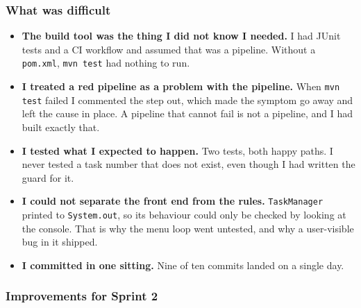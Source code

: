 \documentclass[11pt,a4paper]{article}
\newcommand{\code}[1]{\texttt{\small #1}}
\begin{document}
\subsubsection*{What was difficult}
\begin{itemize}
  \item \textbf{The build tool was the thing I did not know I needed.} I had
        JUnit tests and a CI workflow and assumed that was a pipeline. Without
        a \code{pom.xml}, \code{mvn test} had nothing to run.
  \item \textbf{I treated a red pipeline as a problem with the pipeline.} When
        \code{mvn test} failed I commented the step out, which made the symptom
        go away and left the cause in place. A pipeline that cannot fail is not
        a pipeline, and I had built exactly that.
  \item \textbf{I tested what I expected to happen.} Two tests, both happy
        paths. I never tested a task number that does not exist, even though I
        had written the guard for it.
  \item \textbf{I could not separate the front end from the rules.}
        \code{TaskManager} printed to \code{System.out}, so its behaviour could
        only be checked by looking at the console. That is why the menu loop
        went untested, and why a user-visible bug in it shipped.
  \item \textbf{I committed in one sitting.} Nine of ten commits landed on a
        single day.
\end{itemize}

\subsubsection*{Improvements for Sprint 2}
\end{document}
